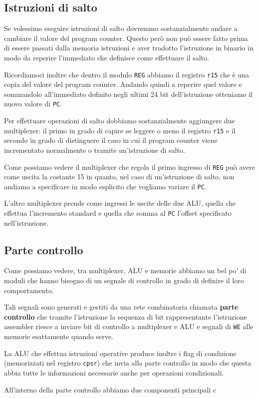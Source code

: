 \subsection{Istruzioni di salto}
Se volessimo eseguire istruzioni di salto dovremmo sostanzialmente andare a cambiare il valore del
program counter. Questo però non può essere fatto prima di essere passati dalla memoria istruzioni
e aver tradotto l'istruzione in binario in modo da reperire l'immediato che definisce come
effettuare il salto.

Ricordiamoci inoltre che dentro il modulo \verb|REG| abbiamo il registro \verb|r15| che è una copia
del valore del program counter. Andando quindi a reperire quel valore e sommandolo all'immediato
definito negli ultimi 24 bit dell'istruzione otteniamo il nuovo valore di \verb|PC|.

Per effettuare operazioni di salto dobbiamo sostanzialmente aggiungere due multiplexer: il primo in
grado di capire se leggere o meno il registro \verb|r15| e il secondo in grado di distinguere il
caso in cui il program counter viene incrementato normalmente o tramite un'istruzione di salto.
\begin{center}
	
\end{center}
Come possiamo vedere il multiplexer che regola il primo ingresso di \verb|REG| può avere come
uscita la costante 15 in quanto, nel caso di un'istruzione di salto, non andiamo a specificare in
modo esplicito che vogliamo variare il \verb|PC|.

L'altro multiplexer prende come ingressi le uscite delle due ALU, quella che effettua l'incremento
standard e quella che somma al \verb|PC| l'offset specificato nell'istruzione.

\subsection{Parte controllo}
Come possiamo vedere, tra multiplexer, ALU e memorie abbiamo un bel po' di moduli che hanno bisogno
di un segnale di controllo in grado di definire il loro comportamento.

Tali segnali sono generati e gestiti da una rete combinatoria chiamata \textbf{parte controllo} che
tramite l'istruzione la sequenza di bit rappresentante l'istruzione assembler riesce a inviare
bit di controllo a multiplexer e ALU e segnali di \verb|WE| alle memorie esattamente quando serve.

La ALU che effettua istruzioni operative produce inoltre i flag di condizione (memorizzati nel
registro \verb|cpsr|) che invia alla parte controllo in modo che questa abbia tutte le informazioni
necessarie anche per operazioni condizionali.

All'interno della parte controllo abbiamo due componenti principali c